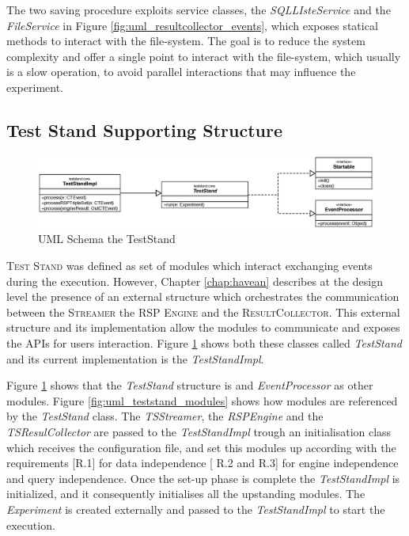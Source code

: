 The two saving procedure exploits service classes, the \textit{SQLLIsteService} and the \textit{FileService} in Figure \ref{fig:uml_resultcollector_events}, which exposes statical methods to interact with the file-system. The goal is to reduce the system complexity and offer a single point to interact with the file-system, which usually is a slow operation, to avoid parallel interactions that may influence the experiment. 


\subsection{Test Stand Supporting Structure}\label{sec:teststand}


\begin{figure}[tbh]
  \centering
	\includegraphics[width=\linewidth]{images/uml_teststand}
	\caption{UML Schema the TestStand} 
  	\label{fig:uml_teststand}
\end{figure}


\name \textsc{Test Stand} was defined as set of modules which interact exchanging events during the execution. However, Chapter \ref{chap:havean} describes at the design level the presence of an external structure which orchestrates the communication between the \textsc{Streamer} the \textsc{RSP Engine} and the \textsc{ResultCollector}. This external structure and its implementation allow the modules to communicate and exposes the APIs for users interaction. Figure \ref{fig:uml_teststand} shows both these classes called \textit{TestStand} and its current implementation is the \textit{TestStandImpl}.


Figure \ref{fig:uml_teststand} shows that the \textit{TestStand} structure is and \textit{EventProcessor} as other modules. Figure \ref{fig:uml_teststand_modules} shows how  modules are referenced by the \textit{TestStand} class. The \textit{TSStreamer}, the \textit{RSPEngine} and the \textit{TSResulCollector} are passed to the \textit{TestStandImpl} trough an initialisation class which receives the configuration file, and set this modules up according with the requirements [R.1] for data independence  [ R.2 and R.3] for engine independence and query independence. Once the set-up phase is complete the \textit{TestStandImpl} is initialized, and it consequently initialises all the upstanding modules. The \textit{Experiment} is created externally and passed to the \textit{TestStandImpl} to start the execution. 

